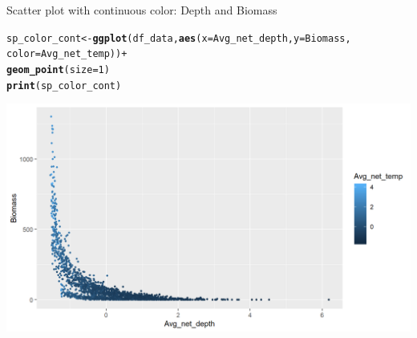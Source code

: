 \documentclass{beamer}\usepackage[]{graphicx}\usepackage[]{color}
\makeatletter
\newcommand{\hlnum}[1]{\textcolor[rgb]{0.686,0.059,0.569}{#1}}%
\newcommand{\hlopt}[1]{\textcolor[rgb]{0,0,0}{#1}}%
\newcommand{\hlstd}[1]{\textcolor[rgb]{0.345,0.345,0.345}{#1}}%
\newcommand{\hlkwb}[1]{\textcolor[rgb]{0.69,0.353,0.396}{#1}}%
\newcommand{\hlkwc}[1]{\textcolor[rgb]{0.333,0.667,0.333}{#1}}%
\newcommand{\hlkwd}[1]{\textcolor[rgb]{0.737,0.353,0.396}{\textbf{#1}}}%
\newenvironment{kframe}{%
 \def\at@end@of@kframe{}%
 \ifinner\ifhmode%
  \def\at@end@of@kframe{\end{minipage}}%
  \begin{minipage}{\columnwidth}%
 \fi\fi%
 \def\FrameCommand##1{\hskip\@totalleftmargin \hskip-\fboxsep
 \colorbox{shadecolor}{##1}\hskip-\fboxsep
     \hskip-\linewidth \hskip-\@totalleftmargin \hskip\columnwidth}%
 \MakeFramed {\advance\hsize-\width
   \@totalleftmargin\z@ \linewidth\hsize
   \@setminipage}}%
 {\par\unskip\endMakeFramed%
 \at@end@of@kframe}
\newenvironment{knitrout}{}{} %
\makeatother
\begin{document}
\begin{frame}[fragile]{Scatter plot with continuous color: Depth and Biomass}
\begin{knitrout}\footnotesize
{}\color{fgcolor}\begin{kframe}
\begin{alltt}
\hlstd{sp_color_cont} \hlkwb{<-} \hlkwd{ggplot}\hlstd{(df_data,} \hlkwd{aes}\hlstd{(}\hlkwc{x}\hlstd{=Avg_net_depth,} \hlkwc{y}\hlstd{=Biomass,}
                                     \hlkwc{color}\hlstd{=Avg_net_temp))} \hlopt{+}
  \hlkwd{geom_point}\hlstd{(}\hlkwc{size}\hlstd{=}\hlnum{1}\hlstd{)}
\hlkwd{print}\hlstd{(sp_color_cont)}
\end{alltt}
\end{kframe}

{\centering \includegraphics[width=.9\linewidth]{figure/sp_color_cont-1} 

}



\end{knitrout}
\end{frame}
\end{document}
